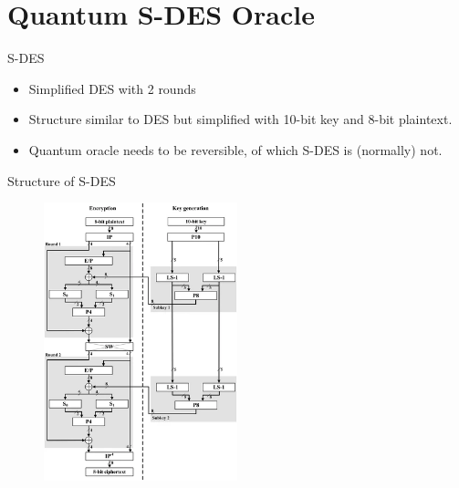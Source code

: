 \documentclass{beamer}
\begin{document}
	\section{Quantum S-DES Oracle}
	
	\begin{frame}{S-DES}
		\begin{itemize}
			\item Simplified DES with 2 rounds
			\item Structure similar to DES but simplified with 10-bit key and 8-bit plaintext.
			\item Quantum oracle needs to be reversible, of which S-DES is (normally) not.
		\end{itemize}
	\end{frame}
	
	\begin{frame}{Structure of S-DES}
		\begin{figure}[h]
			\centering
			\includegraphics[width=0.5\textwidth]{./Images/sdes.png}
		\end{figure}
	\end{frame}
	
\end{document}
